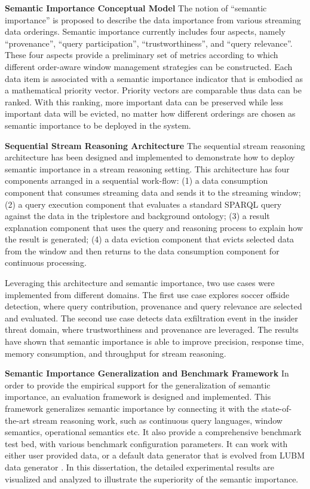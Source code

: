 \textbf{Semantic Importance Conceptual Model}
The notion of ``semantic importance'' is proposed to describe the data importance from various streaming data orderings. 
Semantic importance currently includes four aspects, 
namely ``provenance'', ``query participation'', ``trustworthiness'', and ``query relevance''.
These four aspects provide a preliminary set of metrics according to which different order-aware window management strategies can be constructed.
Each data item is associated with a semantic importance indicator that is embodied as a mathematical priority vector.
Priority vectors are comparable thus data can be ranked.
With this ranking, more important data can be preserved while less important data will be evicted, no matter how different orderings are chosen as semantic importance to be deployed in the system.

\textbf{Sequential Stream Reasoning Architecture} 
The sequential stream reasoning architecture has been designed and implemented to demonstrate how to deploy semantic importance in a stream reasoning setting.
This architecture has four components arranged in a sequential work-flow: 
(1) a data consumption component that consumes streaming data and sends it to the streaming window;
(2) a query execution component that evaluates a standard SPARQL query against the data in the triplestore and background ontology; 
(3) a result explanation component that uses the query and reasoning process to explain how the result is generated;
(4) a data eviction component that evicts selected data from the window and then returns to the data consumption component for continuous processing.  

Leveraging this architecture and semantic importance, two use cases were implemented from different domains. 
The first use case explores soccer offside detection, where query contribution, provenance and query relevance are selected and evaluated. 
The second use case detects data exfiltration event in the insider threat domain, where trustworthiness and provenance are leveraged.
The results have shown that semantic importance is able to improve precision, response time, memory consumption, and throughput for stream reasoning.

\textbf{Semantic Importance Generalization and Benchmark Framework}
In order to provide the empirical support for the generalization of semantic importance, an evaluation framework is designed and implemented.
This framework generalizes semantic importance by connecting it with the state-of-the-art stream reasoning work, such as continuous query languages, window semantics, operational semantics etc. 
It also provide a comprehensive benchmark test bed, with various benchmark configuration parameters. 
It can work with either user provided data, or a default data generator that is evolved from LUBM data generator \cite{guo2005lubm}.
In this dissertation, the detailed experimental results are visualized and analyzed to illustrate the superiority of the semantic importance.